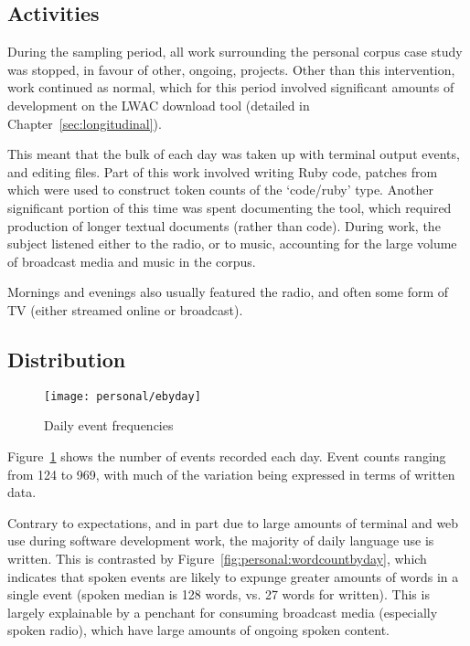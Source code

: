 




\subsection{Activities}
During the sampling period, all work surrounding the personal corpus case study was stopped, in favour of other, ongoing, projects.  Other than this intervention, work continued as normal, which for this period involved significant amounts of development on the LWAC download tool (detailed in Chapter~\ref{sec:longitudinal}).

This meant that the bulk of each day was taken up with terminal output events, and editing files.  Part of this work involved writing Ruby code, patches from which were used to construct token counts of the `code/ruby' type.  Another significant portion of this time was spent documenting the tool, which required production of longer textual documents (rather than code).  During work, the subject listened either to the radio, or to music, accounting for the large volume of broadcast media and music in the corpus.

Mornings and evenings also usually featured the radio, and often some form of TV (either streamed online or broadcast).







\subsection{Distribution}

\begin{figure}[htb]
    \centering
    \texttt{[image: personal/ebyday]}
    \caption{Daily event frequencies}
    \label{fig:personal:eventcountbyday}
\end{figure}


Figure~\ref{fig:personal:eventcountbyday} shows the number of events recorded each day.  Event counts ranging from 124 to 969, with much of the variation being expressed in terms of written data.

Contrary to expectations, and in part due to large amounts of terminal and web use during software development work, the majority of daily language use is written.  This is contrasted by Figure~\ref{fig:personal:wordcountbyday}, which indicates that spoken events are likely to expunge greater amounts of words in a single event (spoken median is 128 words, vs. 27 words for written).  This is largely explainable by a penchant for consuming broadcast media (especially spoken radio), which have large amounts of ongoing spoken content.


